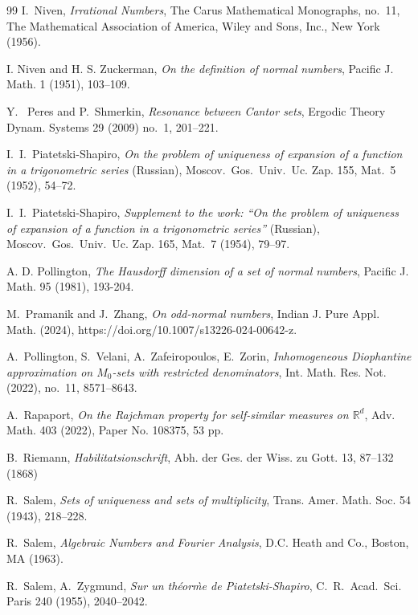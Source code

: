 \documentclass[12pt, twoside]{article}
\theoremstyle{definition}
\numberwithin{equation}{section}
\begin{document}
\begin{thebibliography}{99}
I.~Niven, 
{\em{Irrational Numbers}}, 
The Carus Mathematical Monographs, no.~11, The Mathematical Association of America, 
Wiley and Sons, Inc., New York (1956). 

I. Niven and H. S. Zuckerman,
{\em{On the definition of normal numbers}},
Pacific J. Math. 1 (1951), 103--109. 

Y.~ Peres and P.~Shmerkin, 
{\em{Resonance between Cantor sets}}, 
Ergodic Theory Dynam. Systems 29 (2009) no.~1, 201--221. 

I.~I.~Piatetski-Shapiro,
{\em{On the problem of uniqueness of expansion of a function in a trigonometric series}} (Russian), 
Moscov.~Gos.~Univ.~Uc. Zap. 155, Mat.~5 (1952), 54--72. 

I.~I.~Piatetski-Shapiro,
{\em{Supplement to the work: ``On the problem of uniqueness of expansion of a function in a trigonometric series''}} (Russian), 
Moscov.~Gos.~Univ.~Uc. Zap. 165, Mat.~7 (1954), 79--97. 

A. D. Pollington,
{\em{The Hausdorff dimension of a set of normal numbers}},
Pacific J. Math. 95 (1981), 193-204.

M.~Pramanik and J.~Zhang, 
{\em{On odd-normal numbers}}, Indian J. Pure Appl. Math. (2024), https://doi.org/10.1007/s13226-024-00642-z.


A.~Pollington, S.~Velani, A.~Zafeiropoulos, E.~Zorin, 
{\em{Inhomogeneous Diophantine approximation on $M_0$-sets with restricted denominators}}, 
Int. Math. Res. Not. (2022), no.~11, 8571--8643. 

A.~Rapaport, 
{\em{On the Rajchman property for self-similar measures on $\mathbb R^d$}}, 
Adv. Math. 403 (2022), Paper No. 108375, 53 pp.

B.~Riemann, 
{\em{Habilitatsionschrift}}, 
Abh. der Ges. der Wiss. zu Gott. 13, 87–132 (1868)

R.~Salem, 
{\em{Sets of uniqueness and sets of multiplicity}}, 
Trans. Amer. Math. Soc. 54 (1943), 218–228. 

R.~Salem, 
{\em{Algebraic Numbers and Fourier Analysis}}, D.C. Heath and
Co., Boston, MA (1963).

R.~Salem, A.~Zygmund, 
{\em{Sur un th\'eor\`me de Piatetski-Shapiro}}, 
C.~R.~Acad.~Sci. Paris 240 (1955), 2040--2042.


\end{thebibliography}
\end{document}
